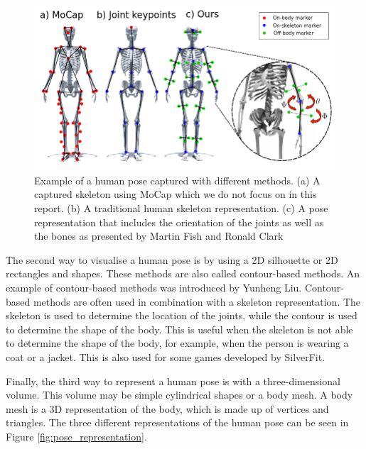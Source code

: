 \begin{figure}
    \centering
    \includegraphics[width=0.8\linewidth]{figures/HPE/PoseExample.png}
    \caption[Example for human Pose estimation]{Example of a human pose captured with different methods. (a) A captured skeleton using MoCap which we do not focus on in this report. (b) A traditional human skeleton representation. (c) A pose representation that includes the orientation of the joints as well as the bones as presented by Martin Fish and Ronald Clark\cite{KeypointOrientation}}
    \label{fig:pose_example}
\end{figure}

The second way to visualise a human pose is by using a 2D silhouette or 2D rectangles and shapes. These methods are also called contour-based methods. An example of contour-based methods was introduced by Yunheng Liu\cite{contourHPE}. Contour-based methods are often used in combination with a skeleton representation. The skeleton is used to determine the location of the joints, while the contour is used to determine the shape of the body. This is useful when the skeleton is not able to determine the shape of the body, for example, when the person is wearing a coat or a jacket. This is also used for some games developed by SilverFit.

Finally, the third way to represent a human pose is with a three-dimensional volume. This volume may be simple cylindrical shapes or a body mesh. A body mesh is a 3D representation of the body, which is made up of vertices and triangles. The three different representations of the human pose can be seen in Figure \ref{fig:pose_representation}.

